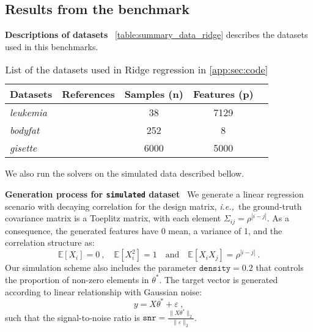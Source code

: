 \documentclass{article}
\newcommand{\ie}{{\em i.e.,~}}
\newcommand{\myparagraph}[1]{\vspace{1mm}\noindent\textbf{#1} \,}
\begin{document}
\subsection{Results from the benchmark}

\myparagraph{Descriptions of datasets}
\autoref{table:summary_data_ridge} describes the datasets used in this benchmarks.

\begin{table}[h]
  \centering
  \caption{List of the datasets used in Ridge regression in \autoref{app:sec:code}}
      \begin{tabular}{llS[table-format=8.0]S[table-format=7.0]S[table-format=1.1e-1,scientific-notation=true]}
        \toprule
        \textbf{Datasets} & \textbf{References} &{\textbf{Samples ($\mathbf{n}$)}} & {\textbf{Features ($\mathbf{p}$)}} \\
        \midrule
        \emph{leukemia} &\citet{leukemia} & 38 & 7129  \\
        \emph{bodyfat} &\citet{madelon} & 252 & 8   \\
        \emph{gisette} &\citet{madelon} & 6000 & 5000  \\
        \bottomrule
    \end{tabular}
    \label{table:summary_data_ridge}
\end{table}

We also run the solvers on the simulated data described bellow.



\myparagraph{Generation process for \texttt{simulated}
dataset}
\label{app:simulated_dataset}
We generate a linear regression scenario with decaying correlation for the design matrix, \ie the ground-truth covariance matrix is a Toeplitz matrix, with each element $\Sigma_{ij} = \rho^{|i-j|}$.
As a consequence, the generated features have 0 mean, a variance of 1, and the correlation structure as:
\begin{equation}
            \mathbb E[X_i] = 0~, \quad \mathbb E[X_i^2] = 1  \quad
        \text{and} \quad \mathbb E[X_iX_j] = \rho^{|i-j|} \ .
\end{equation}
Our simulation scheme also includes the parameter $\texttt{density}=0.2$ that controls the proportion of non-zero elements in $\theta^*$.
The target vector is generated according to linear relationship with Gaussian noise:
\begin{equation*}
     y = X \theta^* + \varepsilon \ ,
\end{equation*}
such that the signal-to-noise ratio is $\texttt{snr} = \frac{\|X \theta^*\|_2}{\|\varepsilon\|_2}$.
\end{document}
